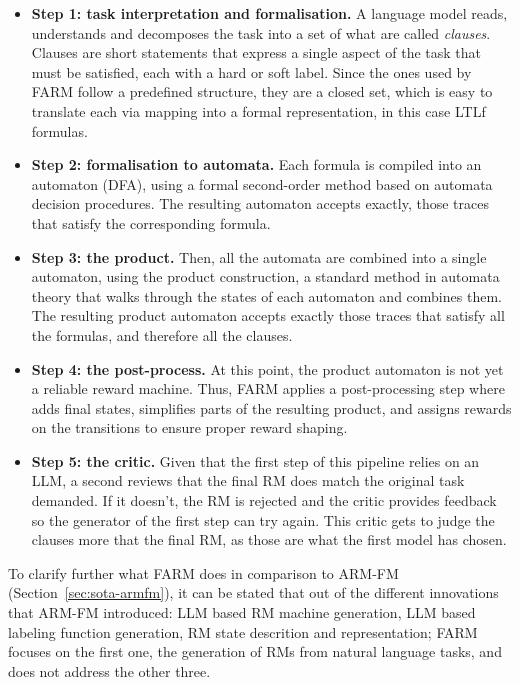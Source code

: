 \documentclass[11pt,english,listoffigures,listoftables]{tfgetsinf}
\begin{document}
\begin{itemize}
    \item \textbf{Step 1: task interpretation and formalisation.} A language model reads, understands and decomposes the task into a set of what are called \textit{clauses}. Clauses are short statements that express a single aspect of the task that must be satisfied, each with a hard or soft label. Since the ones used by FARM follow a predefined structure, they are a closed set, which is easy to translate each via mapping into a formal representation, in this case LTLf formulas.
    \item \textbf{Step 2: formalisation to automata.} Each formula is compiled into an automaton (DFA), using a formal second-order method based on automata decision procedures. The resulting automaton accepts exactly, those traces that satisfy the corresponding formula.
    \item \textbf{Step 3: the product.} Then, all the automata are combined into a single automaton, using the product construction, a standard method in automata theory that walks through the states of each automaton and combines them. The resulting product automaton accepts exactly those traces that satisfy all the formulas, and therefore all the clauses.
    \item \textbf{Step 4: the post-process.} At this point, the product automaton is not yet a reliable reward machine. Thus, FARM applies a post-processing step where adds final states, simplifies parts of the resulting product, and assigns rewards on the transitions to ensure proper reward shaping. 
    \item \textbf{Step 5: the critic.} Given that the first step of this pipeline relies on an LLM, a second reviews that the final RM does match the original task demanded. If it doesn't, the RM is rejected and the critic provides feedback so the generator of the first step can try again. This critic gets to judge the clauses more that the final RM, as those are what the first model has chosen.
\end{itemize}

To clarify further what FARM does in comparison to ARM-FM (Section~\ref{sec:sota-armfm}), it can be stated that out of the different innovations that ARM-FM introduced: LLM based RM machine generation, LLM based labeling function generation, RM state descrition and representation; FARM focuses on the first one, the generation of RMs from natural language tasks, and does not address the other three.
\end{document}
